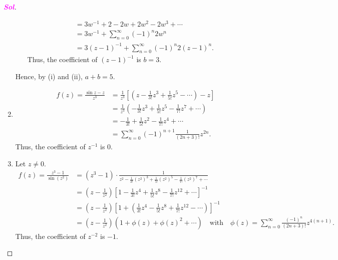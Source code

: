 \documentclass{article}
\newcommand{\inv}[1]{#1^{-1}}
\theoremstyle{definition}
\newcommand{\of}[1]{\left( #1 \right)}
\newcommand{\sol}{\textcolor{magenta}{\bf Sol}}
\begin{document}
\begin{proof}[\sol]
\begin{enumerate}[(1)]
\begin{enumerate}[(i)]
\begin{align*}
					&=3\inv{w}+2-2w+2w^2-2w^3+\cdots\\
					&=3w^{-1}+\sum_{n=0}^\infty (-1)^n2w^n\\
					&=3(z-1)^{-1}+\sum_{n=0}^\infty (-1)^n2(z-1)^n.
				\end{align*} Thus, the coefficient of $(z-1)^{-1}$ is $b=3$.
			\end{enumerate}
			Hence, by (i) and (ii), $a+b=5$.
			\vspace{4pt}
			\item \begin{align*}
			f(z)=\frac{\sin z-z}{z^3}&=\frac{1}{z^3}\left[\of{z-\frac{1}{3!}z^3+\frac{1}{5!}z^5-\cdots}-z\right]\\
			&=\frac{1}{z^3}\of{-\frac{1}{3!}z^3+\frac{1}{5!}z^5-\frac{1}{7!}z^7+\cdots}\\
			&=-\frac{1}{3!}+\frac{1}{5!}z^2-\frac{1}{7!}z^4+\cdots\\
			&=\sum_{n=0}^\infty(-1)^{n+1}\frac{1}{(2n+3)!}z^{2n}.
			\end{align*}
			Thus, the coefficient of $z^{-1}$ is $0$.
			\vspace{4pt}
			\item Let $z\neq 0$. \begin{align*}
			f(z)=\frac{z^3-1}{\sin(z^2)}&=(z^3-1)\cdot\frac{1}{\displaystyle z^2-\frac{1}{3!}(z^2)^3+\frac{1}{5!}(z^2)^5-\frac{1}{7!}(z^2)^7+\cdots}\\
			&=\of{z-\frac{1}{z^2}}\left[1-\frac{1}{3!}z^4+\frac{1}{5!}z^8-\frac{1}{7!}z^{12}+\cdots\right]^{-1}\\
			&=\of{z-\frac{1}{z^2}}\left[1+\of{\frac{1}{3!}z^4-\frac{1}{5!}z^8+\frac{1}{7!}z^{12}-\cdots}\right]^{-1}\\
			&=\of{z-\frac{1}{z^2}}\of{1+\phi(z)+\phi(z)^2+\cdots}\quad\text{with}\quad\phi(z)=\sum_{n=0}^\infty\frac{(-1)^{n}}{(2n+3)!}z^{4(n+1)}.
			\end{align*}
			Thus, the coefficient of $z^{-2}$ is $-1$.
		\end{enumerate}
	\end{proof}
	
\end{document}
